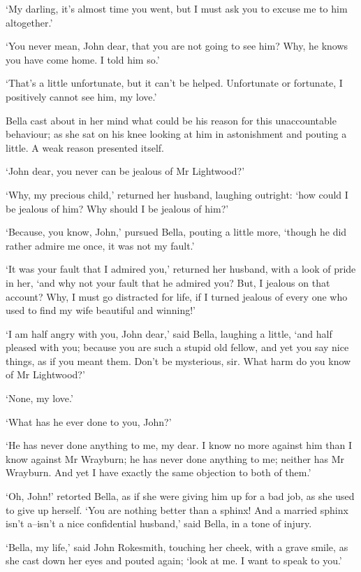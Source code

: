 ‘My darling, it’s almost time you went, but I must ask you to excuse me
to him altogether.’

‘You never mean, John dear, that you are not going to see him? Why, he
knows you have come home. I told him so.’

‘That’s a little unfortunate, but it can’t be helped. Unfortunate or
fortunate, I positively cannot see him, my love.’

Bella cast about in her mind what could be his reason for this
unaccountable behaviour; as she sat on his knee looking at him in
astonishment and pouting a little. A weak reason presented itself.

‘John dear, you never can be jealous of Mr Lightwood?’

‘Why, my precious child,’ returned her husband, laughing outright: ‘how
could I be jealous of him? Why should I be jealous of him?’

‘Because, you know, John,’ pursued Bella, pouting a little more, ‘though
he did rather admire me once, it was not my fault.’

‘It was your fault that I admired you,’ returned her husband, with a
look of pride in her, ‘and why not your fault that he admired you? But,
I jealous on that account? Why, I must go distracted for life, if I
turned jealous of every one who used to find my wife beautiful and
winning!’

‘I am half angry with you, John dear,’ said Bella, laughing a little,
‘and half pleased with you; because you are such a stupid old fellow,
and yet you say nice things, as if you meant them. Don’t be mysterious,
sir. What harm do you know of Mr Lightwood?’

‘None, my love.’

‘What has he ever done to you, John?’

‘He has never done anything to me, my dear. I know no more against
him than I know against Mr Wrayburn; he has never done anything to me;
neither has Mr Wrayburn. And yet I have exactly the same objection to
both of them.’

‘Oh, John!’ retorted Bella, as if she were giving him up for a bad job,
as she used to give up herself. ‘You are nothing better than a sphinx!
And a married sphinx isn’t a--isn’t a nice confidential husband,’ said
Bella, in a tone of injury.

‘Bella, my life,’ said John Rokesmith, touching her cheek, with a grave
smile, as she cast down her eyes and pouted again; ‘look at me. I want
to speak to you.’

